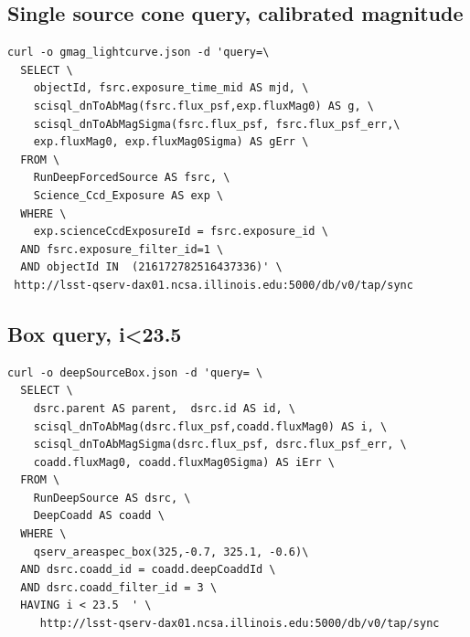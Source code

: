 \documentclass[DM,lsstdraft,toc,usenatbib]{lsstdoc}
\begin{document}
\subsection{Single source cone query, calibrated magnitude}
\label{sec:sql_single_mag}

\begin{lstlisting}
curl -o gmag_lightcurve.json -d 'query=\
  SELECT \
    objectId, fsrc.exposure_time_mid AS mjd, \
    scisql_dnToAbMag(fsrc.flux_psf,exp.fluxMag0) AS g, \
    scisql_dnToAbMagSigma(fsrc.flux_psf, fsrc.flux_psf_err,\
    exp.fluxMag0, exp.fluxMag0Sigma) AS gErr \
  FROM \
    RunDeepForcedSource AS fsrc, \
    Science_Ccd_Exposure AS exp \
  WHERE \
    exp.scienceCcdExposureId = fsrc.exposure_id \
  AND fsrc.exposure_filter_id=1 \
  AND objectId IN  (216172782516437336)' \
 http://lsst-qserv-dax01.ncsa.illinois.edu:5000/db/v0/tap/sync
\end{lstlisting}

\subsection{Box query, i<23.5}
\label{sec:sql_box}

\begin{lstlisting}
curl -o deepSourceBox.json -d 'query= \
  SELECT \
    dsrc.parent AS parent,  dsrc.id AS id, \
    scisql_dnToAbMag(dsrc.flux_psf,coadd.fluxMag0) AS i, \
    scisql_dnToAbMagSigma(dsrc.flux_psf, dsrc.flux_psf_err, \
    coadd.fluxMag0, coadd.fluxMag0Sigma) AS iErr \
  FROM \
    RunDeepSource AS dsrc, \
    DeepCoadd AS coadd \
  WHERE \
    qserv_areaspec_box(325,-0.7, 325.1, -0.6)\
  AND dsrc.coadd_id = coadd.deepCoaddId \
  AND dsrc.coadd_filter_id = 3 \
  HAVING i < 23.5  ' \
     http://lsst-qserv-dax01.ncsa.illinois.edu:5000/db/v0/tap/sync
\end{lstlisting}





\end{document}
